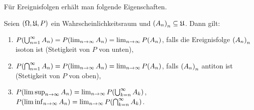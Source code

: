 \documentclass{lecture}
\begin{document}
    Für Ereignisfolgen erhält man folgende Eigenschaften.

    \begin{lemma}
        Seien \(\parentheses*{\Omega, \mathfrak{U}, P}\) ein Wahrscheinlichkeitsraum und \(\parentheses*{A_n}_n \subseteq \mathfrak{U}\).
        Dann gilt:
        \begin{enumerate}
            \item \(P\parentheses*{\bigcup_{n = 1}^\infty A_n} = P\parentheses*{\lim_{n \to \infty}A_n} = \lim_{n \to \infty}P\parentheses*{A_n}\), falls die Ereignisfolge \(\parentheses*{A_n}_n\) isoton ist (Stetigkeit von \(P\) von unten),
            \item \(P\parentheses*{\bigcap_{n = 1}^\infty A_n} = P\parentheses*{\lim_{n \to \infty}A_n} = \lim_{n \to \infty}P\parentheses*{A_n}\), falls \(\parentheses*{A_n}_n\) antiton ist (Stetigkeit von \(P\) von oben),
            \item \(P\parentheses*{\limsup_{n \to \infty}A_n} = \lim_{n \to \infty}P\parentheses*{\bigcup_{k = n}^\infty A_k}\), \(P\parentheses*{\liminf_{n \to \infty}A_n} = \lim_{n \to \infty}P\parentheses*{\bigcap_{k = n}^\infty A_k}\).
        \end{enumerate}
    \end{lemma}
\end{document}
